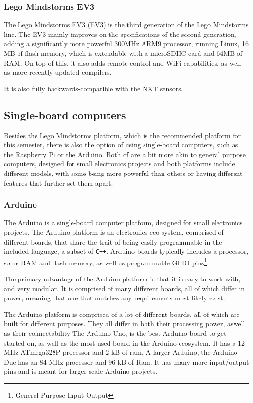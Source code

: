 \subsubsection{Lego Mindstorms EV3}
The  Lego Mindstorms EV3 (EV3) is the third generation of the Lego Mindstorms line.
The EV3 mainly improves on the specifications of the second generation, adding a significantly more powerful 300MHz ARM9 processor, running Linux, 16 MB of flash memory, which is extendable with a microSDHC card and 64MB of RAM\cite{ev3userguide}.
On top of this, it also adds remote control and WiFi capabilities, as well as more recently updated compilers.

It is also fully backwards-compatible with the NXT sensors\cite{ev3nxtcompatability}.

\subsection{Single-board computers}
Besides the Lego Mindstorms platform, which is the recommended platform for this semester, there is also the option of using single-board computers, such as the Raspberry Pi or the Arduino.
Both of are a bit more akin to general purpose computers, designed for small electronics projects and both platforms include different models, with some being more powerful than others or having different features that further set them apart.

\subsubsection{Arduino}
The Arduino is a single-board computer platform, designed for small electronics projects.
The Arduino platform is an electronics eco-system, comprised of different boards, that share the trait of being easily programmable in the included language, a subset of \texttt{C++}.
Arduino boards typically includes a processor, some RAM and flash memory, as well as programmable GPIO pins\footnote{General Purpose Input Output}.

The primary advantage of the Arduino platform is that it is easy to work with, and very modular.
It is comprised of many different boards, all of which differ in power, meaning that one that matches any requirements most likely exist.

The Arduino platform is comprised of a lot of different boards, all of which are built for different purposes.
They all differ in both their processing power, aswell as their connectability
The Arduino Uno, is the best Arduino board to get started on, as well as the most used board in the Arduino ecosystem\cite{ArduinoUno3}.
It has a 12 MHz ATmega328P processor and 2 kB of ram.
A larger Arduino, the Arduino Due has an 84 MHz processor and 96 kB of Ram\cite{ArduinoDue}.
It has many more input/output pins and is meant for larger scale Arduino projects.

